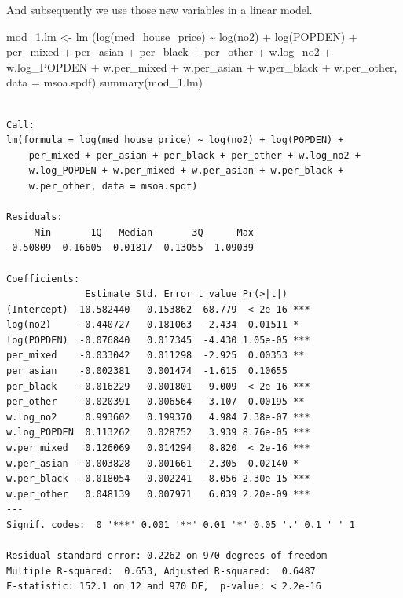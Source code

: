 \documentclass[
  letterpaper,
  DIV=11,
  numbers=noendperiod]{scrreprt}
\newenvironment{Shaded}{\begin{snugshade}}{\end{snugshade}}
\newcommand{\AttributeTok}[1]{\textcolor[rgb]{0.40,0.45,0.13}{#1}}
\newcommand{\FunctionTok}[1]{\textcolor[rgb]{0.28,0.35,0.67}{#1}}
\newcommand{\NormalTok}[1]{\textcolor[rgb]{0.00,0.23,0.31}{#1}}
\newcommand{\OtherTok}[1]{\textcolor[rgb]{0.00,0.23,0.31}{#1}}
\newcommand{\SpecialCharTok}[1]{\textcolor[rgb]{0.37,0.37,0.37}{#1}}
\begin{document}
And subsequently we use those new variables in a linear model.

\begin{Shaded}
\begin{Highlighting}[]
\NormalTok{mod\_1.lm }\OtherTok{\textless{}{-}} \FunctionTok{lm}\NormalTok{ (}\FunctionTok{log}\NormalTok{(med\_house\_price) }\SpecialCharTok{\textasciitilde{}} \FunctionTok{log}\NormalTok{(no2) }\SpecialCharTok{+} \FunctionTok{log}\NormalTok{(POPDEN) }\SpecialCharTok{+} 
\NormalTok{                  per\_mixed }\SpecialCharTok{+}\NormalTok{ per\_asian }\SpecialCharTok{+}\NormalTok{ per\_black }\SpecialCharTok{+}\NormalTok{ per\_other }\SpecialCharTok{+}
\NormalTok{                  w.log\_no2 }\SpecialCharTok{+}\NormalTok{ w.log\_POPDEN }\SpecialCharTok{+}
\NormalTok{                  w.per\_mixed }\SpecialCharTok{+}\NormalTok{ w.per\_asian }\SpecialCharTok{+}\NormalTok{ w.per\_black }\SpecialCharTok{+}\NormalTok{ w.per\_other,}
                \AttributeTok{data =}\NormalTok{ msoa.spdf)}
\FunctionTok{summary}\NormalTok{(mod\_1.lm)}
\end{Highlighting}
\end{Shaded}

\begin{verbatim}

Call:
lm(formula = log(med_house_price) ~ log(no2) + log(POPDEN) + 
    per_mixed + per_asian + per_black + per_other + w.log_no2 + 
    w.log_POPDEN + w.per_mixed + w.per_asian + w.per_black + 
    w.per_other, data = msoa.spdf)

Residuals:
     Min       1Q   Median       3Q      Max 
-0.50809 -0.16605 -0.01817  0.13055  1.09039 

Coefficients:
              Estimate Std. Error t value Pr(>|t|)    
(Intercept)  10.582440   0.153862  68.779  < 2e-16 ***
log(no2)     -0.440727   0.181063  -2.434  0.01511 *  
log(POPDEN)  -0.076840   0.017345  -4.430 1.05e-05 ***
per_mixed    -0.033042   0.011298  -2.925  0.00353 ** 
per_asian    -0.002381   0.001474  -1.615  0.10655    
per_black    -0.016229   0.001801  -9.009  < 2e-16 ***
per_other    -0.020391   0.006564  -3.107  0.00195 ** 
w.log_no2     0.993602   0.199370   4.984 7.38e-07 ***
w.log_POPDEN  0.113262   0.028752   3.939 8.76e-05 ***
w.per_mixed   0.126069   0.014294   8.820  < 2e-16 ***
w.per_asian  -0.003828   0.001661  -2.305  0.02140 *  
w.per_black  -0.018054   0.002241  -8.056 2.30e-15 ***
w.per_other   0.048139   0.007971   6.039 2.20e-09 ***
---
Signif. codes:  0 '***' 0.001 '**' 0.01 '*' 0.05 '.' 0.1 ' ' 1

Residual standard error: 0.2262 on 970 degrees of freedom
Multiple R-squared:  0.653, Adjusted R-squared:  0.6487 
F-statistic: 152.1 on 12 and 970 DF,  p-value: < 2.2e-16
\end{verbatim}
\end{document}
